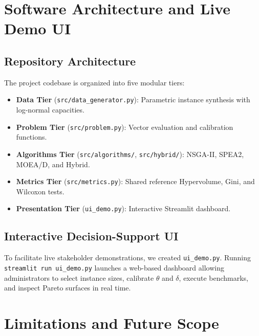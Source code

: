 \documentclass[11pt,a4paper,oneside]{report}
\begin{document}
\chapter{Software Architecture and Live Demo UI}

\section{Repository Architecture}
The project codebase is organized into five modular tiers:
\begin{itemize}
    \item \textbf{Data Tier} (\texttt{src/data\_generator.py}): Parametric instance synthesis with log-normal capacities.
    \item \textbf{Problem Tier} (\texttt{src/problem.py}): Vector evaluation and calibration functions.
    \item \textbf{Algorithms Tier} (\texttt{src/algorithms/}, \texttt{src/hybrid/}): NSGA-II, SPEA2, MOEA/D, and Hybrid.
    \item \textbf{Metrics Tier} (\texttt{src/metrics.py}): Shared reference Hypervolume, Gini, and Wilcoxon tests.
    \item \textbf{Presentation Tier} (\texttt{ui\_demo.py}): Interactive Streamlit dashboard.
\end{itemize}

\section{Interactive Decision-Support UI}
To facilitate live stakeholder demonstrations, we created \texttt{ui\_demo.py}. Running \texttt{streamlit run ui_demo.py} launches a web-based dashboard allowing administrators to select instance sizes, calibrate $\theta$ and $\delta$, execute benchmarks, and inspect Pareto surfaces in real time.

\chapter{Limitations and Future Scope}
\end{document}
